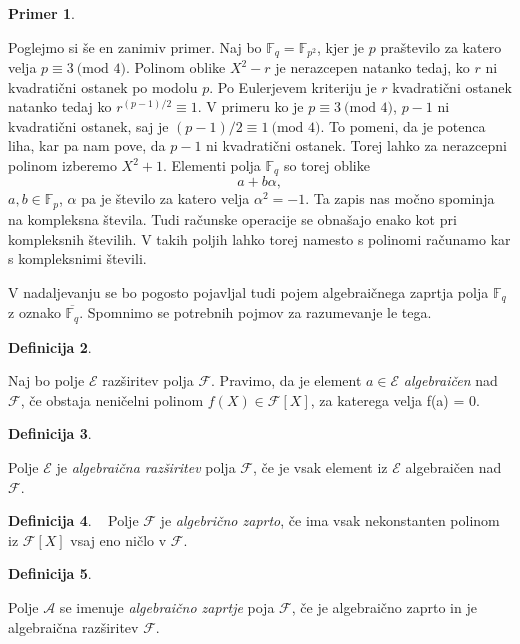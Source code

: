 \documentclass[12pt,a4paper,twoside]{article}
\theoremstyle{definition} %
\newtheorem{definicija}{Definicija}[section]
\newtheorem{primer}[definicija]{Primer}
\theoremstyle{plain} %
\numberwithin{equation}{section}  %
\newcommand{\F}{\mathbb F}
\newcommand{\MOD}[1]{\ \text{(mod }{#1}\text{)}}
\begin{document}
\begin{primer}~

Poglejmo si še en zanimiv primer. Naj bo $\F_q= \F_{p^2}$, kjer je $p$ praštevilo za katero velja $p \equiv 3 \MOD{4}$.  Polinom oblike $X^2-r$ je nerazcepen natanko tedaj, ko $r$ ni kvadratični ostanek po modolu $p$. Po  Eulerjevem kriteriju \cite{Eulerkriterij} je $r$ kvadratični ostanek natanko tedaj ko $r^{(p-1)/2} \equiv 1$. V primeru ko je $p \equiv 3 \MOD{4}$, $p-1$ ni kvadratični ostanek, saj je $(p-1)/2 \equiv 1 \MOD{4}$. To pomeni, da je potenca liha, kar pa nam pove, da $p-1$ ni kvadratični ostanek. Torej lahko za nerazcepni polinom izberemo $X^2+1$. Elementi polja $\F_q$ so torej oblike
$$a+b\alpha,$$
$a,b \in \F_p$, $\alpha$ pa je število za katero velja $\alpha^2 = -1$. Ta zapis nas močno spominja na kompleksna števila. Tudi računske operacije se obnašajo enako kot pri kompleksnih številih. V takih poljih lahko torej namesto s polinomi računamo kar s kompleksnimi števili.
\end{primer}

V nadaljevanju se bo pogosto pojavljal tudi pojem algebraičnega zaprtja polja $\F_q$ z oznako $\overline{\F_q}$. Spomnimo se potrebnih pojmov za razumevanje le tega.

\begin{definicija}~

Naj bo polje $\mathcal{E}$ razširitev polja $\mathcal{F}$. Pravimo, da je element $a \in \mathcal{E}$ \emph{algebraičen}
nad $\mathcal{F}$, če obstaja neničelni polinom $f(X) \in \mathcal{F}[X]$, za katerega velja f(a) = 0.

\end{definicija}

\begin{definicija}~

Polje $\mathcal{E}$ je \emph{algebraična razširitev} polja $\mathcal{F}$, če je vsak element
iz $\mathcal{E}$ algebraičen nad $\mathcal{F}$.
\end{definicija}

\begin{definicija}~
Polje $\mathcal{F}$ je \emph{algebrično zaprto}, če ima vsak nekonstanten polinom
iz $\mathcal{F} [X]$ vsaj eno ničlo v $\mathcal{F}$.
\end{definicija}

\begin{definicija}~

Polje $\mathcal{A}$ se imenuje \emph{algebraično zaprtje} poja $\mathcal{F}$, če je algebraično
zaprto in je algebraična razširitev $\mathcal{F}$.
\end{definicija}
\end{document}

